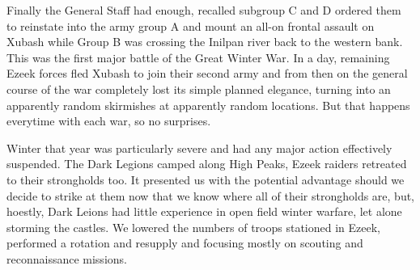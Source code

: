 {Finally the General Staff had enough, recalled subgroup C and D ordered them to reinstate into the army group A and mount an all-on frontal assault on Xubash while Group B was crossing the Inilpan river back to the western bank. This was the first major battle of the Great Winter War. In a day, remaining Ezeek forces fled Xubash to join their second army and from then on the general course of the war completely lost its simple planned elegance, turning into an apparently random skirmishes at apparently random locations. But that happens everytime with each war, so no surprises.

Winter that year was particularly severe and had any major action effectively suspended. The Dark Legions camped along High Peaks, Ezeek raiders retreated to their strongholds too. It presented us with the potential advantage should we decide to strike at them now that we know where all of their strongholds are, but, hoestly, Dark Leions had little experience in open field winter warfare, let alone storming the castles. We lowered the numbers of troops stationed in Ezeek, performed a rotation and resupply and focusing mostly on scouting and reconnaissance missions.

}
